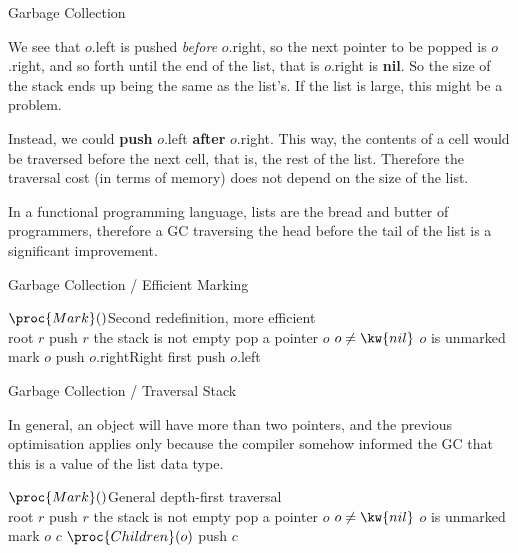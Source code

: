 \documentclass[compress,dvipdfmx]{beamer}
\begin{document}
%
\begin{frame}{Garbage Collection}

  We see that \(o\).left is pushed \emph{before} \(o\).right, so the
  next pointer to be popped is \(o\).right, and so forth until the end
  of the list, that is \(o\).right is \textbf{nil}. So the size of the
  stack ends up being the same as the list's. If the list is large,
  this might be a problem.

  \bigskip

  Instead, we could \textbf{push} \(o\).left \textbf{after}
  \(o\).right. This way, the contents of a cell would be traversed
  before the next cell, that is, the rest of the list. Therefore the
  traversal cost (in terms of memory) does not depend on the size of
  the list.

  \bigskip

  In a functional programming language, lists are the bread and butter
  of programmers, therefore a GC traversing the head before the tail
  of the list is a significant improvement.

\end{frame}

%
\begin{frame}{Garbage Collection / Efficient Marking}

  \begin{codebox}
    \(\proc{Mark}()\)\RComment Second redefinition, more efficient \\
    \li \For {} root \(r\)  push \(r\)
    \li \While the stack is not empty 
    \li \> pop a pointer \(o\)
    \li \> \If \(o \neq \kw{nil}\)  \(o\) is unmarked
    \li    \Then mark \(o\)
    \li          push \(o\).right\RComment Right first
    \li          push \(o\).left
           \End
  \end{codebox}
\end{frame}

%
\begin{frame}{Garbage Collection / Traversal Stack}

  \label{Mark}

  In general, an object will have more than two pointers, and the
  previous optimisation applies only because the compiler somehow
  informed the GC that this is a value of the list data type.
  \begin{codebox}
    \(\proc{Mark}()\)\RComment General depth-first traversal\\
    \li \For {} root \(r\)  push \(r\)
    \li \While the stack is not empty 
    \li \> pop a pointer \(o\)
    \li \> \If \(o \neq \kw{nil}\)  \(o\) is unmarked
    \li    \Then mark \(o\)
    \li          \For {} \(c\)  \(\proc{Children}(o)\) 
    push \(c\)
    \End
  \end{codebox}

\end{frame}
\end{document}
